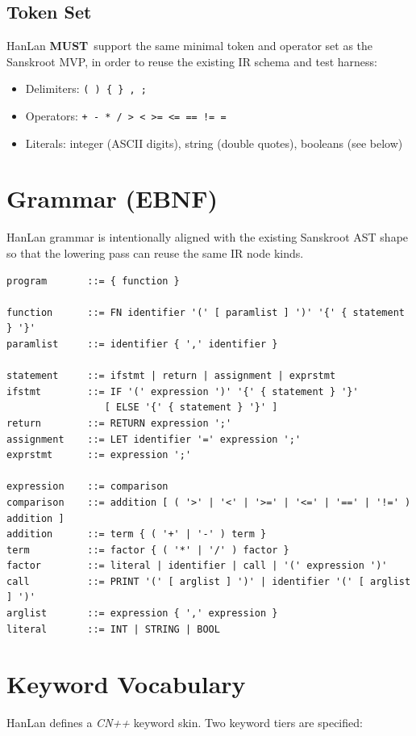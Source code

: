 \documentclass[12pt]{article}
\newcommand{\MUST}{\textbf{MUST}}
\begin{document}
\subsection{Token Set}
HanLan \MUST\ support the same minimal token and operator set as the Sanskroot MVP, in order to reuse
the existing IR schema and test harness:
\begin{itemize}[leftmargin=1.5em]
  \item Delimiters: \texttt{( ) \{ \} , ;}
  \item Operators: \texttt{+ - * / > < >= <= == != =}
  \item Literals: integer (ASCII digits), string (double quotes), booleans (see below)
\end{itemize}

\section{Grammar (EBNF)}
HanLan grammar is intentionally aligned with the existing Sanskroot AST shape so that the lowering pass
can reuse the same IR node kinds.

\begin{verbatim}
program       ::= { function }

function      ::= FN identifier '(' [ paramlist ] ')' '{' { statement } '}'
paramlist     ::= identifier { ',' identifier }

statement     ::= ifstmt | return | assignment | exprstmt
ifstmt        ::= IF '(' expression ')' '{' { statement } '}'
                 [ ELSE '{' { statement } '}' ]
return        ::= RETURN expression ';'
assignment    ::= LET identifier '=' expression ';'
exprstmt      ::= expression ';'

expression    ::= comparison
comparison    ::= addition [ ( '>' | '<' | '>=' | '<=' | '==' | '!=' ) addition ]
addition      ::= term { ( '+' | '-' ) term }
term          ::= factor { ( '*' | '/' ) factor }
factor        ::= literal | identifier | call | '(' expression ')'
call          ::= PRINT '(' [ arglist ] ')' | identifier '(' [ arglist ] ')'
arglist       ::= expression { ',' expression }
literal       ::= INT | STRING | BOOL
\end{verbatim}

\section{Keyword Vocabulary}
HanLan defines a \emph{CN++} keyword skin. Two keyword tiers are specified:
\end{document}
